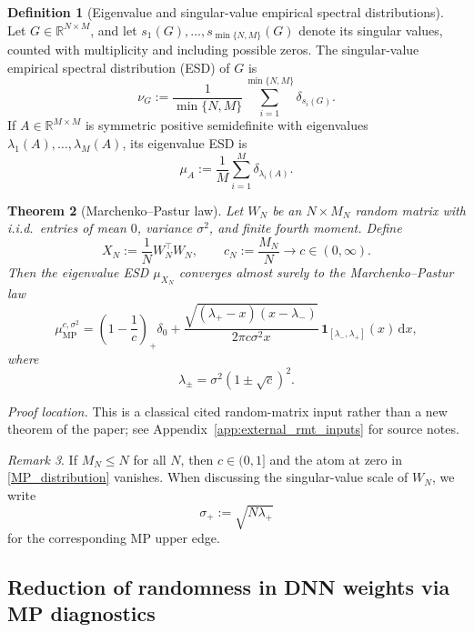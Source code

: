 \documentclass[11pt]{article}
\theoremstyle{plain}
\newtheorem{thm}{Theorem}[section]
\theoremstyle{definition}
\newtheorem{defn}[thm]{Definition}
\theoremstyle{remark}
\newtheorem{rem}[thm]{Remark}
\newcommand{\R}{\mathbb{R}}
\newcommand{\1}{\mathbf{1}}
\newcommand{\di}{\mathrm{d}}
\newcommand{\proofloc}[1]{\par\noindent\emph{Proof location.} #1\par}
\begin{document}
\begin{defn}[Eigenvalue and singular-value empirical spectral distributions]
\label{ESD_Definition}
Let \(G\in\R^{N\times M}\), and let \(s_1(G),\dots,s_{\min\{N,M\}}(G)\) denote its singular values, counted with multiplicity and including possible zeros. The singular-value empirical spectral distribution (ESD) of \(G\) is
\[
\nu_G:=\frac{1}{\min\{N,M\}}\sum_{i=1}^{\min\{N,M\}}\delta_{s_i(G)}.
\]
If \(A\in\R^{M\times M}\) is symmetric positive semidefinite with eigenvalues \(\lambda_1(A),\dots,\lambda_M(A)\), its eigenvalue ESD is
\[
\mu_A:=\frac{1}{M}\sum_{i=1}^M \delta_{\lambda_i(A)}.
\]
\end{defn}

\begin{thm}[Marchenko--Pastur law]
\label{RMT_MP_theorem}
Let \(W_N\) be an \(N\times M_N\) random matrix with i.i.d.\ entries of mean \(0\), variance \(\sigma^2\), and finite fourth moment. Define
\[
X_N:=\frac{1}{N}W_N^\top W_N,
\qquad c_N:=\frac{M_N}{N}\to c\in(0,\infty).
\]
Then the eigenvalue ESD \(\mu_{X_N}\) converges almost surely to the Marchenko--Pastur law
\begin{equation}
\label{MP_distribution}
\mu_{\mathrm{MP}}^{c,\sigma^2}
=
\left(1-\frac{1}{c}\right)_+\delta_0
+
\frac{\sqrt{(\lambda_+-x)(x-\lambda_-)}}{2\pi c\sigma^2 x}\,
\1_{[\lambda_-,\lambda_+]}(x)\,\di x,
\end{equation}
where
\begin{equation}
\label{lambda_parameters}
\lambda_\pm=\sigma^2(1\pm \sqrt c)^2.
\end{equation}
\end{thm}
\proofloc{This is a classical cited random-matrix input rather than a new theorem of the paper; see Appendix~\ref{app:external_rmt_inputs} for source notes.}

\begin{rem}
If \(M_N\le N\) for all \(N\), then \(c\in(0,1]\) and the atom at zero in \eqref{MP_distribution} vanishes. When discussing the singular-value scale of \(W_N\), we write
\[
\sigma_+ := \sqrt{N\lambda_+}
\]
for the corresponding MP upper edge.
\end{rem}

\subsection{Reduction of randomness in DNN weights via MP diagnostics}
\label{overallpicture}
\end{document}

